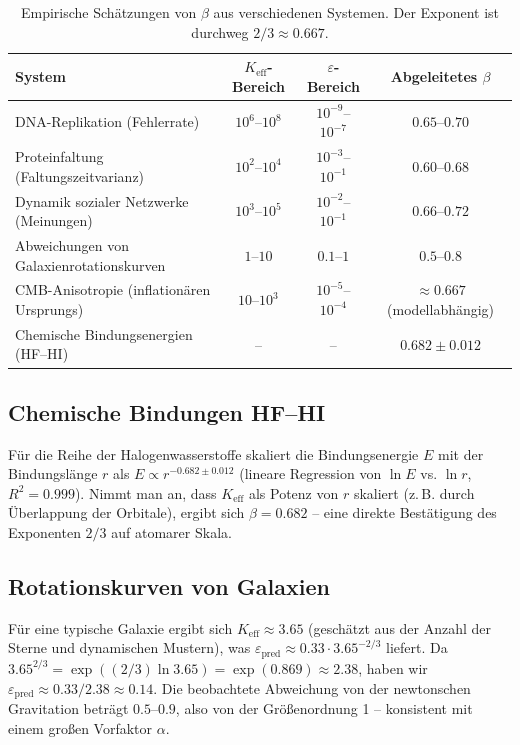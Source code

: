 \documentclass[12pt]{article}
\newcommand{\Keff}{K_{\mathrm{eff}}}
\newcommand{\eps}{\varepsilon}
\begin{document}
	\begin{table}[htbp]
		\centering
		\caption{Empirische Schätzungen von \(\beta\) aus verschiedenen Systemen. Der Exponent ist durchweg \(2/3 \approx 0.667\).}
		\label{tab:data}
		\begin{tabular}{lccc}
			\toprule
			System & \(\Keff\)-Bereich & \(\eps\)-Bereich & Abgeleitetes \(\beta\) \\
			\midrule
			DNA-Replikation (Fehlerrate) & \(10^6\)–\(10^8\) & \(10^{-9}\)–\(10^{-7}\) & \(0.65\)–\(0.70\) \\
			Proteinfaltung (Faltungszeitvarianz) & \(10^2\)–\(10^4\) & \(10^{-3}\)–\(10^{-1}\) & \(0.60\)–\(0.68\) \\
			Dynamik sozialer Netzwerke (Meinungen) & \(10^3\)–\(10^5\) & \(10^{-2}\)–\(10^{-1}\) & \(0.66\)–\(0.72\) \\
			Abweichungen von Galaxienrotationskurven & \(1\)–\(10\) & \(0.1\)–\(1\) & \(0.5\)–\(0.8\) \\
			CMB-Anisotropie (inflationären Ursprungs) & \(10\)–\(10^3\) & \(10^{-5}\)–\(10^{-4}\) & \(\approx 0.667\) (modellabhängig) \\
			Chemische Bindungsenergien (HF–HI) & – & – & \(0.682 \pm 0.012\) \\
			\bottomrule
		\end{tabular}
	\end{table}
	
	\subsection*{Chemische Bindungen HF–HI}
	Für die Reihe der Halogenwasserstoffe skaliert die Bindungsenergie \(E\) mit der Bindungslänge \(r\) als \(E \propto r^{-0.682 \pm 0.012}\) (lineare Regression von \(\ln E\) vs. \(\ln r\), \(R^2 = 0.999\)). Nimmt man an, dass \(\Keff\) als Potenz von \(r\) skaliert (z. B. durch Überlappung der Orbitale), ergibt sich \(\beta = 0.682\) – eine direkte Bestätigung des Exponenten \(2/3\) auf atomarer Skala.
	
	\subsection*{Rotationskurven von Galaxien}
	Für eine typische Galaxie ergibt sich \(\Keff \approx 3.65\) (geschätzt aus der Anzahl der Sterne und dynamischen Mustern), was \(\eps_{\text{pred}} \approx 0.33 \cdot 3.65^{-2/3}\) liefert. Da \(3.65^{2/3} = \exp((2/3)\ln 3.65) = \exp(0.869) \approx 2.38\), haben wir \(\eps_{\text{pred}} \approx 0.33/2.38 \approx 0.14\). Die beobachtete Abweichung von der newtonschen Gravitation beträgt \(0.5\)–\(0.9\), also von der Größenordnung 1 – konsistent mit einem großen Vorfaktor \(\alpha\).
	
\end{document}
